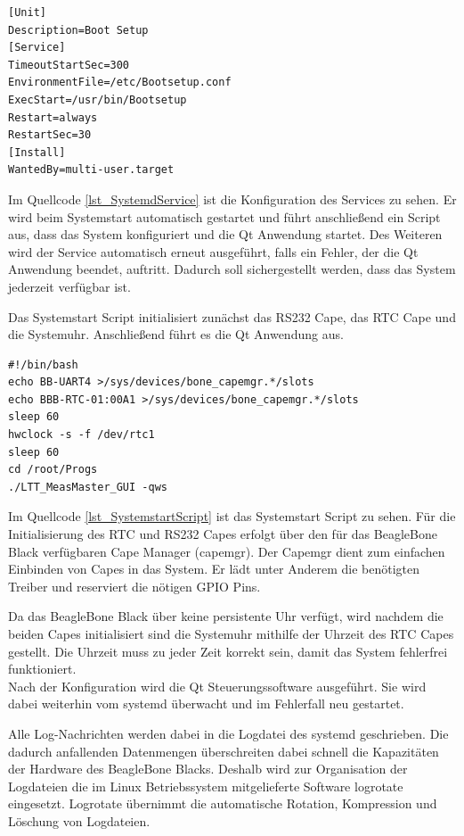 \begin{lstlisting}[caption={Systemd Service},label=lst_SystemdService]
[Unit]
Description=Boot Setup
[Service]
TimeoutStartSec=300
EnvironmentFile=/etc/Bootsetup.conf
ExecStart=/usr/bin/Bootsetup
Restart=always
RestartSec=30
[Install]
WantedBy=multi-user.target
\end{lstlisting}

Im Quellcode \ref{lst_SystemdService} ist die Konfiguration des Services zu sehen. Er wird beim Systemstart automatisch gestartet und führt anschließend ein Script aus, dass das System konfiguriert und die Qt Anwendung startet. Des Weiteren wird der Service automatisch erneut ausgeführt, falls ein Fehler, der die Qt Anwendung beendet, auftritt. Dadurch soll sichergestellt werden, dass das System jederzeit verfügbar ist.\ 

Das Systemstart Script initialisiert zunächst das RS232 Cape, das \ac{RTC} Cape und die Systemuhr. Anschließend führt es die Qt Anwendung aus.\\ 

\begin{lstlisting}[caption={Systemstart Script},label=lst_SystemstartScript]
#!/bin/bash
echo BB-UART4 >/sys/devices/bone_capemgr.*/slots
echo BBB-RTC-01:00A1 >/sys/devices/bone_capemgr.*/slots
sleep 60
hwclock -s -f /dev/rtc1
sleep 60
cd /root/Progs
./LTT_MeasMaster_GUI -qws
\end{lstlisting}

Im Quellcode \ref{lst_SystemstartScript} ist das Systemstart Script zu sehen. Für die Initialisierung des RTC und RS232 Capes erfolgt über den für das BeagleBone Black verfügbaren Cape Manager (capemgr). Der Capemgr \cite{Capemgr} dient zum einfachen Einbinden von Capes in das System. Er lädt unter Anderem die benötigten Treiber und reserviert die nötigen \ac{GPIO} Pins.\ 

Da das BeagleBone Black über keine persistente Uhr verfügt, wird nachdem die beiden Capes initialisiert sind die Systemuhr mithilfe der Uhrzeit des RTC Capes gestellt. Die Uhrzeit muss zu jeder Zeit korrekt sein, damit das System fehlerfrei funktioniert.\\
Nach der Konfiguration wird die Qt Steuerungssoftware ausgeführt. Sie wird dabei weiterhin vom systemd überwacht und im Fehlerfall neu gestartet.\ 

Alle Log-Nachrichten werden dabei in die Logdatei des systemd geschrieben. Die dadurch anfallenden Datenmengen überschreiten dabei schnell die Kapazitäten der Hardware des BeagleBone Blacks. Deshalb wird zur Organisation der Logdateien die im Linux Betriebssystem mitgelieferte Software logrotate \cite{logrotate} eingesetzt. Logrotate übernimmt die automatische Rotation, Kompression und Löschung von Logdateien.\\

